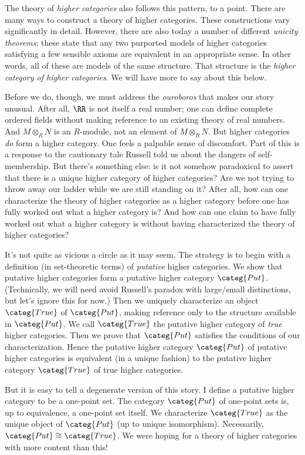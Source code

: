 The theory of \emph{higher categories} also follows this pattern, to a point. 
There are many ways to construct a theory of higher categories.
These constructions vary significantly in detail.
However, there are also today a number of different \emph{unicity theorems};
these state that
any two purported models of higher categories satisfying a few sensible axioms are equivalent in an appropriate sense.
In other words, all of these are models of the same structure.
That structure is the \emph{higher category of higher categories}.
We will have more to say about this below.

Before we do, though, we must address the \emph{ouroboros} that makes our story unusual.
After all, $\RR$ is not itself a real number;
one can define complete ordered fields without making reference to an existing theory of real numbers.
And $M \otimes_R N$ is an $R$-module, not an element of $M \otimes_R N$.
But higher categories \emph{do} form a higher category.
One feels a palpable sense of discomfort.
Part of this is a response to the cautionary tale Russell told us about the dangers of self-membership.
But there's something else:
is it not somehow paradoxical to assert that there is a unique higher category of higher categories?
Are we not trying to throw away our ladder while we are still standing on it?
After all, how can one characterize the theory of higher categories as a higher category before one has fully worked out what a higher category is?
And how can one claim to have fully worked out what a higher category is without having characterized the theory of higher categories?

It's not quite as vicious a circle as it may seem.
The strategy is to begin with a definition (in set-theoretic terms) of \emph{putative} higher categories.
We show that putative higher categories form a putative higher category $\categ{Put}$.
(Technically, we will need avoid Russell's paradox with large/small distinctions, but let's ignore this for now.)
Then we uniquely characterize an object $\categ{True}$ of $\categ{Put}$, making reference only to the structure available in $\categ{Put}$.
We call $\categ{True}$ the putative higher category of \emph{true} higher categories.
Then we prove that $\categ{Put}$ satisfies the conditions of our characterization.
Hence the putative higher category $\categ{Put}$ of putative higher categories is equivalent (in a unique fashion) to the putative higher category $\categ{True}$ of true higher categories.

But it is easy to tell a degenerate version of this story.
I define a putative higher category to be a one-point set.
The category $\categ{Put}$ of one-point sets is, up to equivalence, a one-point set itself.
We characterize $\categ{True}$ as the unique object of $\categ{Put}$ (up to unique isomorphism).
Necessarily, $\categ{Put} \cong \categ{True}$.
We were hoping for a theory of higher categories with more content than this!

